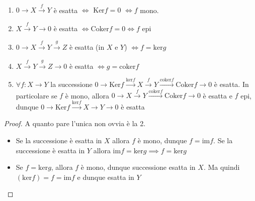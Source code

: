 \begin{proposition}{} \(\) 
\begin{enumerate}[label = \arabic*.] 
    \item \(0 \to X \overset{f}{\to } Y\) è esatta \(\iff\) \(\mathrm{Ker}f = 0\) \(\iff f \) mono.
    \item[\(1^{op}\).] \(X \overset{f}{\to} Y \to 0\) è esatta \(\iff \mathrm{Coker}f = 0 \iff f\) epi
    \item \(0 \to X \overset{f}{\to } Y \overset{g}{\to } Z\) è esatta (in \(X\) e \(Y\)) \(\iff f = \mathrm{ker}g\)
    \item[\(2^{op}\).] \(X \overset{f}{\to } Y \overset{g}{\to } Z \to 0\) è esatta \(\iff g = \mathrm{coker}f\)
    \item \(\forall f : X \to Y\) la successione \(0 \to \mathrm{Ker}f \overset{\mathrm{ker}f}{\to } X \overset{f}{\to} Y \overset{\mathrm{coker}f}{\to } \mathrm{Coker}f \to 0\) è esatta. In particolare se \(f\) è mono, allora \(0 \to X \overset{f}{\to } Y \overset{\mathrm{coker}f}{\to } \mathrm{Coker}f \to 0\) è esatta e \(f\) epi, dunque \(0 \to \mathrm{Ker}f \overset{\mathrm{ker}f}{\to } X \to Y \to 0\) è esatta
\end{enumerate}
\end{proposition}

\begin{proof}{}
    A quanto pare l'unica non ovvia è la 2.
    \begin{itemize}
        \item[\(\implies \)] Se la successione è esatta in \(X\) allora \(f\) è
            mono, dunque \(f = \mathrm{im}f\). Se la successione è esatta in \(Y\) allora \(\mathrm{im}f = \mathrm{ker}g \implies f = \mathrm{ker}g\) 
        \item[\(\impliedby \)] Se \(f = \mathrm{ker}g\), allora \(f\) è mono, dunque successione
    esatta in \(X\). Ma quindi \((\mathrm{ker}f) = f = \mathrm{im}f\) e dunque esatta in \(Y\) 
    \end{itemize} 
\end{proof}

